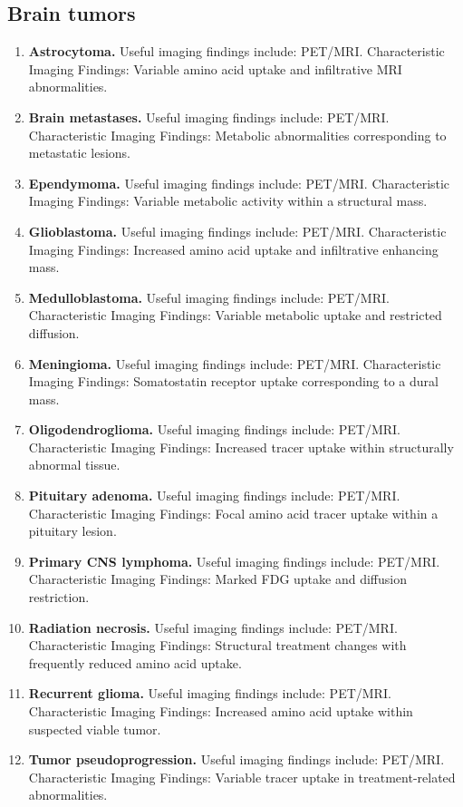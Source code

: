 \subsection{Brain tumors}
\begin{enumerate}[leftmargin=*,itemsep=0.45em,topsep=0.4em]
\item \textbf{Astrocytoma.} Useful imaging findings include: PET/MRI. Characteristic Imaging Findings: Variable amino acid uptake and infiltrative MRI abnormalities.
\item \textbf{Brain metastases.} Useful imaging findings include: PET/MRI. Characteristic Imaging Findings: Metabolic abnormalities corresponding to metastatic lesions.
\item \textbf{Ependymoma.} Useful imaging findings include: PET/MRI. Characteristic Imaging Findings: Variable metabolic activity within a structural mass.
\item \textbf{Glioblastoma.} Useful imaging findings include: PET/MRI. Characteristic Imaging Findings: Increased amino acid uptake and infiltrative enhancing mass.
\item \textbf{Medulloblastoma.} Useful imaging findings include: PET/MRI. Characteristic Imaging Findings: Variable metabolic uptake and restricted diffusion.
\item \textbf{Meningioma.} Useful imaging findings include: PET/MRI. Characteristic Imaging Findings: Somatostatin receptor uptake corresponding to a dural mass.
\item \textbf{Oligodendroglioma.} Useful imaging findings include: PET/MRI. Characteristic Imaging Findings: Increased tracer uptake within structurally abnormal tissue.
\item \textbf{Pituitary adenoma.} Useful imaging findings include: PET/MRI. Characteristic Imaging Findings: Focal amino acid tracer uptake within a pituitary lesion.
\item \textbf{Primary CNS lymphoma.} Useful imaging findings include: PET/MRI. Characteristic Imaging Findings: Marked FDG uptake and diffusion restriction.
\item \textbf{Radiation necrosis.} Useful imaging findings include: PET/MRI. Characteristic Imaging Findings: Structural treatment changes with frequently reduced amino acid uptake.
\item \textbf{Recurrent glioma.} Useful imaging findings include: PET/MRI. Characteristic Imaging Findings: Increased amino acid uptake within suspected viable tumor.
\item \textbf{Tumor pseudoprogression.} Useful imaging findings include: PET/MRI. Characteristic Imaging Findings: Variable tracer uptake in treatment-related abnormalities.
\end{enumerate}

